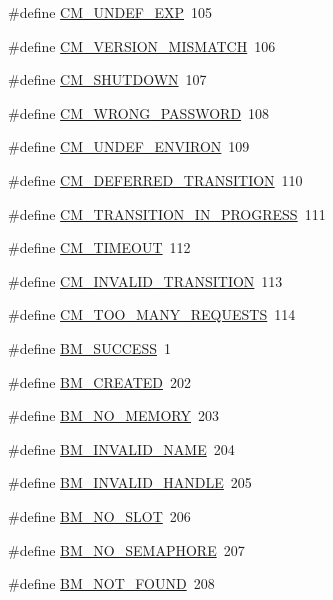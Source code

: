 \begin{DoxyCompactItemize}
\item 
\#define \hyperlink{group__err21_ga10f9c3f1a23d0f63f86edf36143c849d}{CM\_\-UNDEF\_\-EXP}~105
\item 
\#define \hyperlink{group__err21_gae706ef5a8d5795d01ba8fa67d6db6302}{CM\_\-VERSION\_\-MISMATCH}~106
\item 
\#define \hyperlink{group__err21_ga76db0fac26b6f3dcdc29ec8b640c5a5f}{CM\_\-SHUTDOWN}~107
\item 
\#define \hyperlink{group__err21_ga9a26da1c28eadf3f46a335b41520ecd8}{CM\_\-WRONG\_\-PASSWORD}~108
\item 
\#define \hyperlink{group__err21_gaf3ff2980ad033cdeb6ed0bb53dfec41c}{CM\_\-UNDEF\_\-ENVIRON}~109
\item 
\#define \hyperlink{group__err21_ga56216c4157257715878749974191b697}{CM\_\-DEFERRED\_\-TRANSITION}~110
\item 
\#define \hyperlink{group__err21_ga5eb422d9ad83d53c886a16a4691e7eb4}{CM\_\-TRANSITION\_\-IN\_\-PROGRESS}~111
\item 
\#define \hyperlink{group__err21_ga3f98d4cb53674e51840088d7c8435d85}{CM\_\-TIMEOUT}~112
\item 
\#define \hyperlink{group__err21_ga23fd8fcf5d790b87dd9d8a77e263a2d4}{CM\_\-INVALID\_\-TRANSITION}~113
\item 
\#define \hyperlink{group__err21_ga651caeed4e07732c8ce40c41c69ba9a2}{CM\_\-TOO\_\-MANY\_\-REQUESTS}~114
\item 
\#define \hyperlink{group__err22_gadccfb762fd84f9e33940f3d1204042b0}{BM\_\-SUCCESS}~1
\item 
\#define \hyperlink{group__err22_gaf4d0ec9887b0864c100b8062d21f4c0b}{BM\_\-CREATED}~202
\item 
\#define \hyperlink{group__err22_ga5425d2a3621de60926128a3cbaa501cc}{BM\_\-NO\_\-MEMORY}~203
\item 
\#define \hyperlink{group__err22_ga3320beea9944241434c6bf98d2392414}{BM\_\-INVALID\_\-NAME}~204
\item 
\#define \hyperlink{group__err22_ga992d6577e774ebe1c50b501917c788b8}{BM\_\-INVALID\_\-HANDLE}~205
\item 
\#define \hyperlink{group__err22_ga5d9eb250e07354dc4d5de87388feff44}{BM\_\-NO\_\-SLOT}~206
\item 
\#define \hyperlink{group__err22_gaf9bc9724347f2c84c37b2725b0fa6b2c}{BM\_\-NO\_\-SEMAPHORE}~207
\item 
\#define \hyperlink{group__err22_ga3ec707ba57a9f56c19bf8d8581d8291b}{BM\_\-NOT\_\-FOUND}~208
\item 

\end{DoxyCompactItemize}
